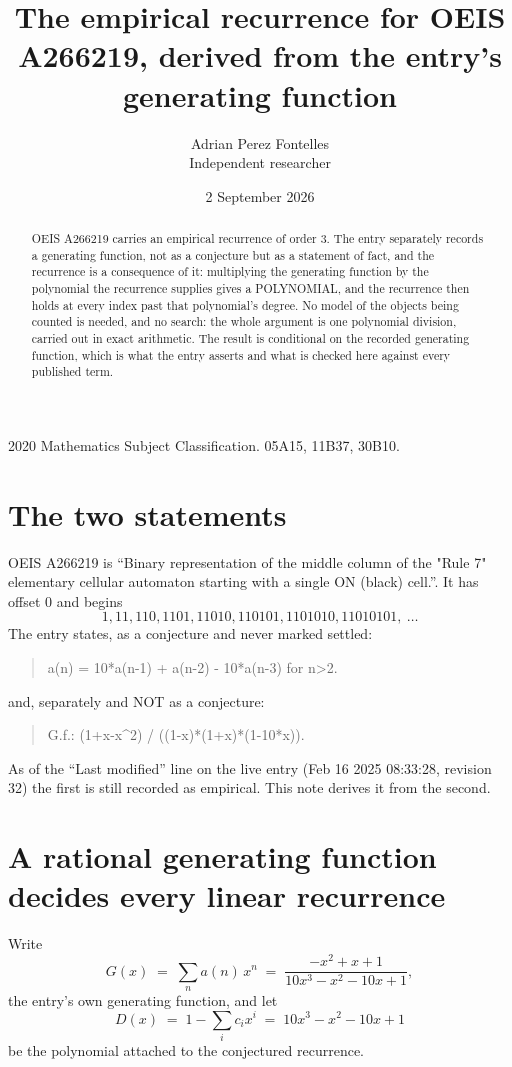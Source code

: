\documentclass[11pt,a4paper]{article}
\title{The empirical recurrence for OEIS A266219, derived from the entry's generating function}
\author{Adrian Perez Fontelles\\ \small Independent researcher}
\date{2 September 2026}
\theoremstyle{plain}
\theoremstyle{definition}
\begin{document}
\maketitle

\begin{abstract}
OEIS A266219 carries an empirical recurrence of order $3$. The entry separately records a
generating function, not as a conjecture but as a statement of fact, and the recurrence is a
consequence of it: multiplying the generating function by the polynomial the recurrence
supplies gives a POLYNOMIAL, and the recurrence then holds at every index past that
polynomial's degree. No model of the objects being counted is needed, and no search: the
whole argument is one polynomial division, carried out in exact arithmetic. The result is
conditional on the recorded generating function, which is what the entry asserts and what is
checked here against every published term.
\end{abstract}

\noindent\small 2020 Mathematics Subject Classification. 05A15, 11B37, 30B10.\normalsize

\section{The two statements}

OEIS A266219 is ``Binary representation of the middle column of the "Rule 7" elementary cellular automaton starting with a single ON (black) cell.''. It has offset $0$ and begins
\[
1, 11, 110, 1101, 11010, 110101, 1101010, 11010101,\ \dots
\]
The entry states, as a conjecture and never marked settled:
\begin{quote}
a(n) = 10*a(n-1) + a(n-2) - 10*a(n-3) for n>2.
\end{quote}
and, separately and NOT as a conjecture:
\begin{quote}
G.f.: (1+x-x\^{}2) / ((1-x)*(1+x)*(1-10*x)).
\end{quote}
As of the ``Last modified'' line on the live entry (Feb 16 2025 08:33:28, revision 32) the first is still
recorded as empirical. This note derives it from the second.

\section{A rational generating function decides every linear recurrence}

Write
\[
G(x)\;=\;\sum_{n}a(n)\,x^{n}\;=\;\frac{- x^{2} + x + 1}{10 x^{3} - x^{2} - 10 x + 1},
\]
the entry's own generating function, and let
\[
D(x)\;=\;1-\sum_i c_i x^{i}\;=\;10 x^{3} - x^{2} - 10 x + 1
\]
be the polynomial attached to the conjectured recurrence.
\end{document}
